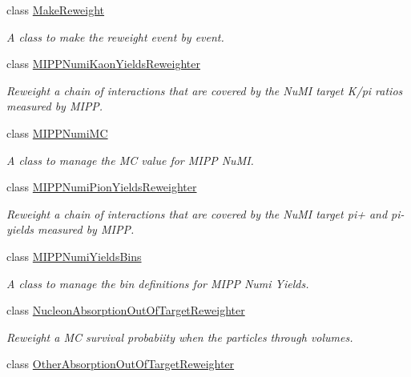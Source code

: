 \begin{DoxyCompactItemize}
class \hyperlink{class_neutrino_flux_reweight_1_1_make_reweight}{Make\-Reweight}
\begin{DoxyCompactList}\small\item\em A class to make the reweight event by event. \end{DoxyCompactList}\item 
class \hyperlink{class_neutrino_flux_reweight_1_1_m_i_p_p_numi_kaon_yields_reweighter}{M\-I\-P\-P\-Numi\-Kaon\-Yields\-Reweighter}
\begin{DoxyCompactList}\small\item\em Reweight a chain of interactions that are covered by the Nu\-M\-I target K/pi ratios measured by M\-I\-P\-P. \end{DoxyCompactList}\item 
class \hyperlink{class_neutrino_flux_reweight_1_1_m_i_p_p_numi_m_c}{M\-I\-P\-P\-Numi\-M\-C}
\begin{DoxyCompactList}\small\item\em A class to manage the M\-C value for M\-I\-P\-P Nu\-M\-I. \end{DoxyCompactList}\item 
class \hyperlink{class_neutrino_flux_reweight_1_1_m_i_p_p_numi_pion_yields_reweighter}{M\-I\-P\-P\-Numi\-Pion\-Yields\-Reweighter}
\begin{DoxyCompactList}\small\item\em Reweight a chain of interactions that are covered by the Nu\-M\-I target pi+ and pi-\/ yields measured by M\-I\-P\-P. \end{DoxyCompactList}\item 
class \hyperlink{class_neutrino_flux_reweight_1_1_m_i_p_p_numi_yields_bins}{M\-I\-P\-P\-Numi\-Yields\-Bins}
\begin{DoxyCompactList}\small\item\em A class to manage the bin definitions for M\-I\-P\-P Numi Yields. \end{DoxyCompactList}\item 
class \hyperlink{class_neutrino_flux_reweight_1_1_nucleon_absorption_out_of_target_reweighter}{Nucleon\-Absorption\-Out\-Of\-Target\-Reweighter}
\begin{DoxyCompactList}\small\item\em Reweight a M\-C survival probabiity when the particles through volumes. \end{DoxyCompactList}\item 
class \hyperlink{class_neutrino_flux_reweight_1_1_other_absorption_out_of_target_reweighter}{Other\-Absorption\-Out\-Of\-Target\-Reweighter}

\end{DoxyCompactItemize}
